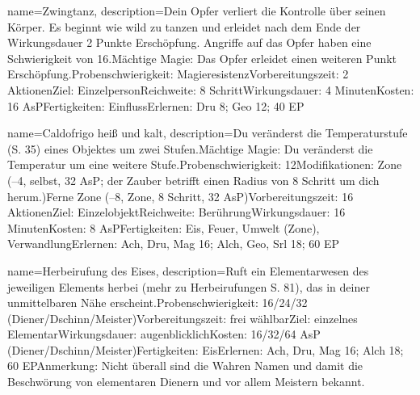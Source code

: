 {
    name={Zwingtanz},
    description={Dein Opfer verliert die Kontrolle über seinen Körper. Es beginnt wie wild zu tanzen und erleidet nach dem Ende der Wirkungsdauer 2 Punkte Erschöpfung. Angriffe auf das Opfer haben eine Schwierigkeit von 16.\newline Mächtige Magie: Das Opfer erleidet einen weiteren Punkt Erschöpfung.\newline Probenschwierigkeit: Magieresistenz\newline Vorbereitungszeit: 2 Aktionen\newline Ziel: Einzelperson\newline Reichweite: 8 Schritt\newline Wirkungsdauer: 4 Minuten\newline Kosten: 16 AsP\newline Fertigkeiten: Einfluss\newline Erlernen: Dru 8; Geo 12; 40 EP}
}


{
    name={Caldofrigo heiß und kalt},
    description={Du veränderst die Temperaturstufe (S. 35) eines Objektes um zwei Stufen.\newline Mächtige Magie: Du veränderst die Temperatur um eine weitere Stufe.\newline Probenschwierigkeit: 12\newline Modifikationen: Zone (–4, selbst, 32 AsP; der Zauber betrifft einen Radius von 8 Schritt um dich herum.)\newline Ferne Zone (–8, Zone, 8 Schritt, 32 AsP)\newline Vorbereitungszeit: 16 Aktionen\newline Ziel: Einzelobjekt\newline Reichweite: Berührung\newline Wirkungsdauer: 16 Minuten\newline Kosten: 8 AsP\newline Fertigkeiten: Eis, Feuer, Umwelt (Zone), Verwandlung\newline Erlernen: Ach, Dru, Mag 16; Alch, Geo, Srl 18; 60 EP}
}


{
    name={Herbeirufung des Eises},
    description={Ruft ein Elementarwesen des jeweiligen Elements herbei (mehr zu Herbeirufungen S. 81), das in deiner unmittelbaren Nähe erscheint.\newline Probenschwierigkeit: 16/24/32 (Diener/Dschinn/Meister)\newline Vorbereitungszeit: frei wählbar\newline Ziel: einzelnes Elementar\newline Wirkungsdauer: augenblicklich\newline Kosten: 16/32/64 AsP (Diener/Dschinn/Meister)\newline Fertigkeiten: Eis\newline Erlernen: Ach, Dru, Mag 16; Alch 18; 60 EP\newline Anmerkung: Nicht überall sind die Wahren Namen und damit die Beschwörung von elementaren Dienern und vor allem Meistern bekannt. }
}


